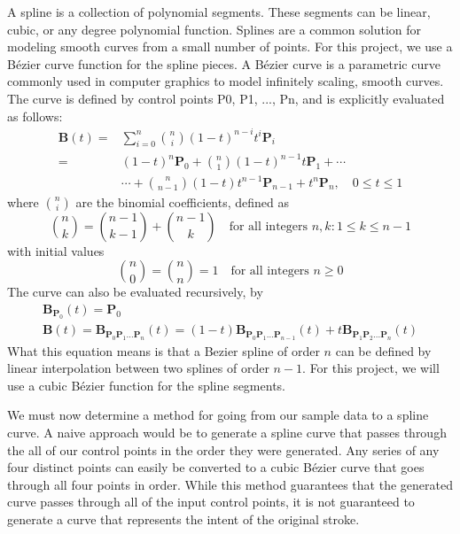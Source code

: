 A spline is a collection of polynomial segments.
These segments can be linear, cubic, or any degree polynomial function.
Splines are a common solution for modeling smooth curves from a small number of points.
For this project, we use a Bézier curve function for the spline pieces.
A Bézier curve is a parametric curve commonly used in computer graphics to model infinitely scaling, smooth curves.
The curve is defined by control points P0, P1, ..., Pn, and is explicitly evaluated as follows:
\begin{align}
  \mathbf{B}(t) = {} &\sum_{i=0}^n {n\choose i}(1 - t)^{n - i}t^i\mathbf{P}_i \\
                = {} &(1 - t)^n\mathbf{P}_0 + {n\choose 1}(1 - t)^{n - 1}t\mathbf{P}_1 + \cdots \\
                  {} &\cdots + {n\choose n - 1}(1 - t)t^{n - 1}\mathbf{P}_{n - 1} + t^n\mathbf{P}_n,\quad 0 \le t \le 1
\end{align}
where $\scriptstyle {n \choose i}$ are the binomial coefficients, defined as
\begin{equation}
\binom nk = \binom{n-1}{k-1} + \binom{n-1}k \quad \text{for all integers }n,k : 1\le k\le n-1
\end{equation}
with initial values 
\begin{equation}
\binom n0 = \binom nn = 1 \quad \text{for all integers } n\ge0
\end{equation}
The curve can also be evaluated recursively, by
\begin{align}
\mathbf{B}_{\mathbf{P}_0}(t) = \mathbf{P}_0 \\
\mathbf{B}(t) = \mathbf{B}_{\mathbf{P}_0\mathbf{P}_1\ldots\mathbf{P}_n}(t) = (1-t)\mathbf{B}_{\mathbf{P}_0\mathbf{P}_1\ldots\mathbf{P}_{n-1}}(t) + t\mathbf{B}_{\mathbf{P}_1\mathbf{P}_2\ldots\mathbf{P}_n}(t)
\end{align}
What this equation means is that a Bezier spline of order $n$ can be defined by linear interpolation between two splines of order $n - 1$.
For this project, we will use a cubic Bézier function for the spline segments.

We must now determine a method for going from our sample data to a spline curve.
A naive approach would be to generate a spline curve that passes through the all of our control points in the order they were generated.
Any series of any four distinct points can easily be converted to a cubic Bézier curve that goes through all four points in order.
While this method guarantees that the generated curve passes through all of the input control points, it is not guaranteed to generate a curve that represents the intent of the original stroke.


